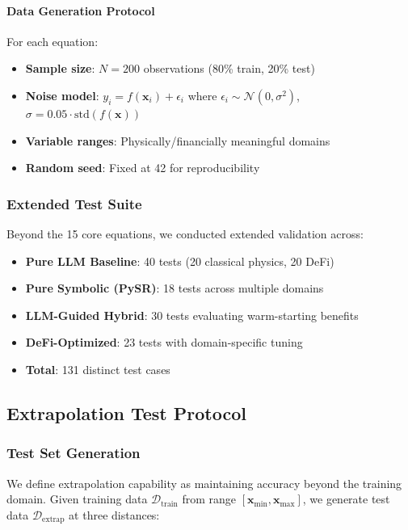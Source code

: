 \paragraph{Data Generation Protocol}

For each equation:
\begin{itemize}
    \item \textbf{Sample size}: $N = 200$ observations (80\% train, 20\% test)
    \item \textbf{Noise model}: $y_i = f(\mathbf{x}_i) + \epsilon_i$ where $\epsilon_i \sim \mathcal{N}(0, \sigma^2)$, $\sigma = 0.05 \cdot \text{std}(f(\mathbf{x}))$
    \item \textbf{Variable ranges}: Physically/financially meaningful domains
    \item \textbf{Random seed}: Fixed at 42 for reproducibility
\end{itemize}

\subsubsection{Extended Test Suite}

Beyond the 15 core equations, we conducted extended validation across:
\begin{itemize}
\item \textbf{Pure LLM Baseline}: 40 tests (20 classical physics, 20 DeFi)
\item \textbf{Pure Symbolic (PySR)}: 18 tests across multiple domains
\item \textbf{LLM-Guided Hybrid}: 30 tests evaluating warm-starting benefits
\item \textbf{DeFi-Optimized}: 23 tests with domain-specific tuning
\item \textbf{Total}: 131 distinct test cases
\end{itemize}


\subsection{Extrapolation Test Protocol}
\label{sec:extrapolation_metric}

\subsubsection{Test Set Generation}

We define extrapolation capability as maintaining accuracy beyond the training domain. Given training data $\mathcal{D}_{\text{train}}$ from range $[\mathbf{x}_{\min}, \mathbf{x}_{\max}]$, we generate test data $\mathcal{D}_{\text{extrap}}$ at three distances:

